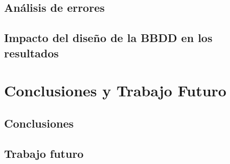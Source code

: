 \documentclass[12pt, a4paper]{article}
\begin{document}
\subsection{Análisis de errores}

\subsection{Impacto del diseño de la BBDD en los resultados}

\section{Conclusiones y Trabajo Futuro}
\label{sec:conclusiones}

\subsection{Conclusiones}

\subsection{Trabajo futuro}

\newpage

\end{document}
